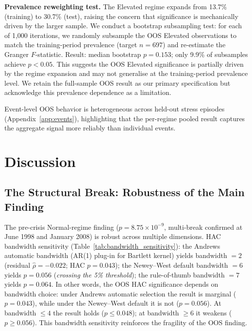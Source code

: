 \documentclass[sigconf,anonymous]{acmart}
\begin{document}
\textbf{Prevalence reweighting test.}
The Elevated regime expands from 13.7\% (training) to 30.7\% (test),
raising the concern that significance is mechanically driven by the larger sample.
We conduct a bootstrap subsampling test: for each of 1{,}000 iterations, we randomly
subsample the OOS Elevated observations to match the training-period prevalence
(target $n = 697$) and re-estimate the Granger $F$-statistic.
Result: median bootstrap $p = 0.153$; only 9.9\% of subsamples achieve $p < 0.05$.
This suggests the OOS Elevated significance is partially driven by the regime expansion
and may not generalise at the training-period prevalence level.
We retain the full-sample OOS result as our primary specification but acknowledge
this prevalence dependence as a limitation.

Event-level OOS behavior is heterogeneous across held-out stress episodes
(Appendix~\ref{app:events}), highlighting that the per-regime pooled result
captures the aggregate signal more reliably than individual events.

\section{Discussion}

\subsection{The Structural Break: Robustness of the Main Finding}
\label{sec:robustness}
\label{sec:msvar}
\label{sec:trading}
\label{sec:risk_monitoring}

The pre-crisis Normal-regime finding ($p = 8.75 \times 10^{-9}$, multi-break
confirmed at June 1998 and January 2008) is robust across multiple dimensions.
HAC bandwidth sensitivity (Table~\ref{tab:bandwidth_sensitivity}): the
Andrews~\cite{andrews1991heteroskedasticity} automatic bandwidth
(AR(1) plug-in for Bartlett kernel) yields bandwidth $= 2$
(residual $\hat{\rho} = -0.022$; HAC $p = 0.043$);
the Newey--West default bandwidth $= 6$ yields $p = 0.056$
(\emph{crossing the 5\% threshold}); the rule-of-thumb bandwidth $= 7$
yields $p = 0.064$.
In other words, the OOS HAC significance depends on bandwidth choice:
under Andrews automatic selection the result is marginal ($p = 0.043$),
while under the Newey--West default it is not ($p = 0.056$).
At bandwidth $\leq 4$ the result holds ($p \leq 0.048$); at bandwidth
$\geq 6$ it weakens ($p \geq 0.056$). This bandwidth sensitivity
reinforces the fragility of the OOS finding.
\end{document}
